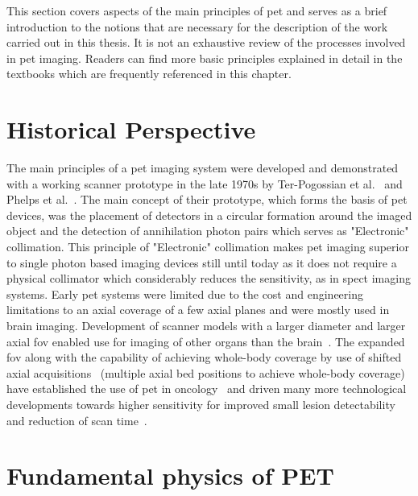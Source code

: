 This section covers aspects of the main principles of \gls{pet} and serves as a brief introduction to the notions that are necessary for the description of the work carried out in this thesis. It is not an exhaustive review of the processes involved in \gls{pet} imaging. Readers can find more basic principles explained in detail in the textbooks which are frequently referenced in this chapter.

\section{Historical Perspective}
The main principles of a \Gls{pet} imaging system were developed and demonstrated with a working scanner prototype in the late 1970s by Ter-Pogossian et al.~\cite{Ter-Pogossian1975} and Phelps et al.~\cite{Phelps1975}. The main concept of their prototype, which forms the basis of \gls{pet} devices, was the placement of detectors in a circular formation around the imaged object and the detection of annihilation photon pairs which serves as "Electronic" collimation. This principle of "Electronic" collimation makes \gls{pet} imaging superior to single photon based imaging devices still until today as it does not require a physical collimator which considerably reduces the sensitivity, as in \gls{spect} imaging systems.
Early \gls{pet} systems were limited due to the cost and engineering limitations to an axial coverage of a few axial planes and were mostly used in brain imaging. Development of scanner models with a larger diameter and larger axial \gls{fov} enabled use for imaging of other organs than the brain~\cite{Nutt2002}.
The expanded \gls{fov} along with the capability of achieving whole-body coverage by use of shifted axial acquisitions~\cite{Dahlbom1992} (multiple axial bed positions to achieve whole-body coverage) have established the use of \gls{pet} in oncology~\cite{Bomanji2001} and driven many more technological developments towards higher sensitivity for improved small lesion detectability and reduction of scan time~\cite{Jones2017}.


\section{Fundamental physics of PET}

